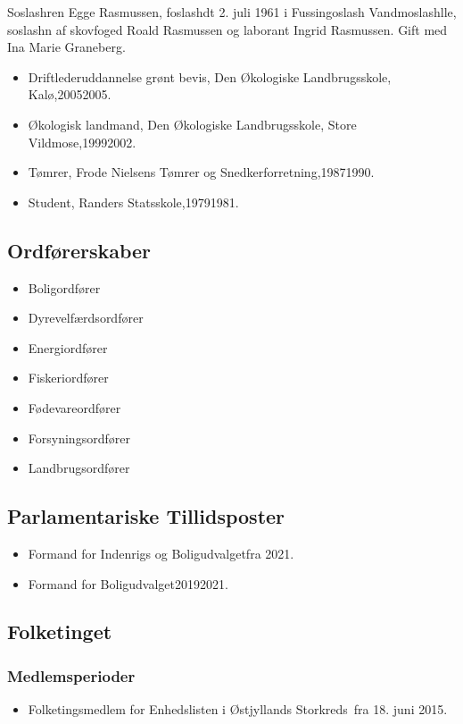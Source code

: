 \documentclass[11pt, a4paper]{awesome-cv}
\begin{document}
\makecvheader[R]
\makelettertitle
\begin{cvletter}
Soslashren Egge Rasmussen, foslashdt 2. juli 1961 i Fussingoslash Vandmoslashlle, soslashn af skovfoged Roald Rasmussen og laborant Ingrid Rasmussen. Gift med Ina Marie Graneberg.

\begin{itemize}
\item Driftlederuddannelse grønt bevis, Den Økologiske Landbrugsskole, Kalø,20052005.
\item Økologisk landmand, Den Økologiske Landbrugsskole, Store Vildmose,19992002.
\item Tømrer, Frode Nielsens Tømrer og Snedkerforretning,19871990.
\item Student, Randers Statsskole,19791981.
\end{itemize}
\subsection*{Ordførerskaber}
\begin{itemize}
\item Boligordfører
\item Dyrevelfærdsordfører
\item Energiordfører
\item Fiskeriordfører
\item Fødevareordfører
\item Forsyningsordfører
\item Landbrugsordfører
\end{itemize}
\subsection*{Parlamentariske Tillidsposter}
\begin{itemize}
\item Formand for Indenrigs og Boligudvalgetfra 2021.
\item Formand for Boligudvalget20192021.
\end{itemize}
\subsection*{Folketinget}
\subsubsection*{Medlemsperioder}
\begin{itemize}
\item Folketingsmedlem for Enhedslisten i Østjyllands Storkreds fra 18. juni 2015.
\end{itemize}

\end{cvletter}
\end{document}
